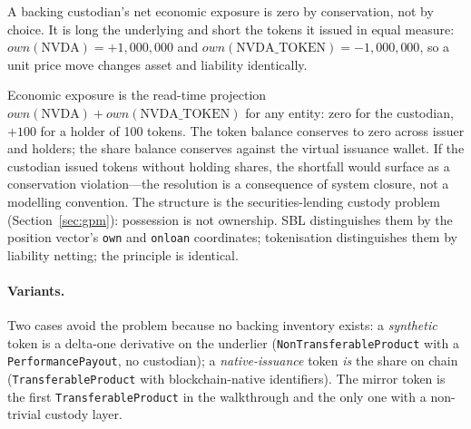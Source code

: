 \begin{principle}
A backing custodian's net economic exposure is zero by conservation, not by choice. It is long the underlying and short the tokens it issued in equal measure: $own(\text{NVDA})=+1{,}000{,}000$ and $own(\text{NVDA\_TOKEN})=-1{,}000{,}000$, so a unit price move changes asset and liability identically.
\end{principle}

Economic exposure is the read-time projection $own(\text{NVDA})+own(\text{NVDA\_TOKEN})$ for any entity: zero for the custodian, $+100$ for a holder of 100 tokens. The token balance conserves to zero across issuer and holders; the share balance conserves against the virtual issuance wallet. If the custodian issued tokens without holding shares, the shortfall would surface as a conservation violation---the resolution is a consequence of system closure, not a modelling convention. The structure is the securities-lending custody problem (Section~\ref{sec:gpm}): possession is not ownership. SBL distinguishes them by the position vector's \texttt{own} and \texttt{onloan} coordinates; tokenisation distinguishes them by liability netting; the principle is identical.

\paragraph{Variants.} Two cases avoid the problem because no backing inventory exists: a \emph{synthetic} token is a delta-one derivative on the underlier (\texttt{Non\allowbreak Transferable\allowbreak Product} with a \texttt{PerformancePayout}, no custodian); a \emph{native-issuance} token \emph{is} the share on chain (\texttt{Transferable\allowbreak Product} with blockchain-native identifiers). The mirror token is the first \texttt{Transferable\allowbreak Product} in the walkthrough and the only one with a non-trivial custody layer.

